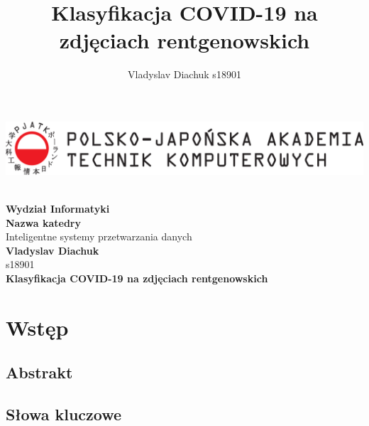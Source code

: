 \documentclass{article}
\title{Klasyfikacja COVID-19 na zdjęciach rentgenowskich}
\author{Vladyslav Diachuk s18901}
\begin{document}
\begin{titlepage}                                                                                        
	\includegraphics[width=\textwidth]{pjwstk_logo}
	\\
	\\
	\begin{center}
		\textbf{Wydział Informatyki}\\
		
		\textbf{Nazwa katedry}\\
		
		Inteligentne systemy przetwarzania danych\\
		
		\textbf{Vladyslav Diachuk}\\
		
		s18901\\
		
		\textbf{Klasyfikacja COVID-19 na zdjęciach rentgenowskich}\\
		
	\end{center}
	
\end{titlepage}


\section{Wstęp}

\subsection{Abstrakt}


\subsection{Słowa kluczowe}


\end{document}
